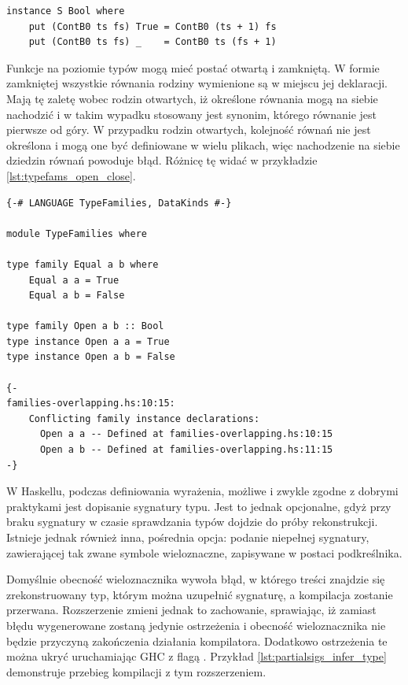 {\begin{lstlisting}[float,label={lst:typefams_assoc_standalone},
                   caption={Przykład pozwiązanej z klasą i niezależnej rodziny typów.}]
instance S Bool where
    put (ContB0 ts fs) True = ContB0 (ts + 1) fs
    put (ContB0 ts fs) _    = ContB0 ts (fs + 1)
\end{lstlisting}

Funkcje na poziomie typów mogą mieć postać otwartą i zamkniętą. W formie
zamkniętej wszystkie równania rodziny wymienione są w miejscu jej
deklaracji. Mają tę zaletę wobec rodzin otwartych, iż określone równania mogą na
siebie nachodzić i w takim wypadku stosowany jest synonim, którego równanie jest
pierwsze od góry. W przypadku rodzin otwartych, kolejność równań nie jest
określona i mogą one być definiowane w wielu plikach, więc nachodzenie na siebie
dziedzin równań powoduje błąd. Różnicę tę widać w przykładzie
\ref{lst:typefams_open_close}\cite{GuideTypeFamilies}.

\begin{lstlisting}[float,label={lst:typefams_open_close},
                   caption={Przykład otwartej i zamkniętej funkcji na typach z nachodzącymi na siebie dziedzinami.}]
{-# LANGUAGE TypeFamilies, DataKinds #-}

module TypeFamilies where

type family Equal a b where
    Equal a a = True
    Equal a b = False

type family Open a b :: Bool
type instance Open a a = True
type instance Open a b = False

{-
families-overlapping.hs:10:15:
    Conflicting family instance declarations:
      Open a a -- Defined at families-overlapping.hs:10:15
      Open a b -- Defined at families-overlapping.hs:11:15
-}
\end{lstlisting}

\label{sec:partial_sigs}

W Haskellu, podczas definiowania wyrażenia, możliwe i zwykle zgodne z dobrymi
praktykami jest dopisanie sygnatury typu. Jest to jednak opcjonalne, gdyż przy
braku sygnatury w czasie sprawdzania typów dojdzie do próby
rekonstrukcji. Istnieje jednak również inna, pośrednia opcja: podanie niepełnej
sygnatury, zawierającej tak zwane symbole wieloznaczne, zapisywane w postaci
podkreślnika.

Domyślnie obecność wieloznacznika wywoła błąd, w którego treści znajdzie się
zrekonstruowany typ, którym można uzupełnić sygnaturę, a kompilacja zostanie
przerwana. Rozszerzenie  zmieni jednak to
zachowanie, sprawiając, iż zamiast błędu wygenerowane zostaną jedynie
ostrzeżenia i obecność wieloznacznika nie będzie przyczyną zakończenia działania
kompilatora. Dodatkowo ostrzeżenia te można ukryć uruchamiając GHC z flagą
. Przykład
\ref{lst:partialsigs_infer_type} demonstruje przebieg kompilacji z tym
rozszerzeniem.

}
